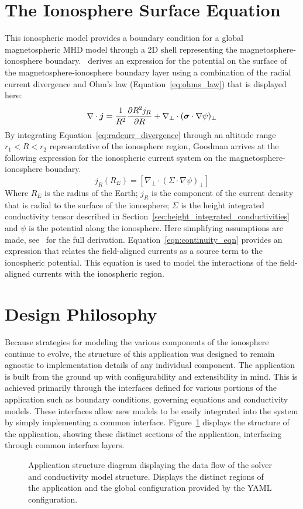 \section{The Ionosphere Surface Equation}
This ionospheric model provides a boundary condition for a global magnetospheric MHD model through a 2D shell representing the magnetosphere-ionosphere boundary.~\citet{goodman1995} derives an expression for the potential on the surface of the magnetosphere-ionosphere boundary layer using a combination of the radial current divergence and Ohm's law (Equation~\ref{eq:ohms_law}) that is displayed here:
\begin{equation}
	\nabla \cdot \bm j = \frac1{R^2}\pdv{R^2j_R}{R} + \nabla_\perp \cdot(\bm\sigma\cdot \nabla\psi)_\perp
	\label{eq:radcurr_divergence}
\end{equation}
By integrating Equation~\ref{eq:radcurr_divergence} through an altitude range $r_1 < R < r_2$ representative of the ionosphere region, Goodman arrives at the following expression for the ionospheric current system on the magnetosphere-ionosphere boundary.
\begin{equation}
	j_R(R_E) = \left[\nabla_\perp \cdot (\Sigma \cdot \nabla\psi)_\perp\right]
	\label{eqn:continuity_eqn}
\end{equation}
Where $R_E$ is the radius of the Earth; $j_R$ is the component of the current density that is radial to the surface of the ionosphere; $\Sigma$ is the height integrated conductivity tensor described in Section~\ref{sec:height_integrated_conductivities} and $\psi$ is the potential along the ionosphere. Here simplifying assumptions are made, see~\citep{goodman1995} for the full derivation. Equation~\ref{eqn:continuity_eqn} provides an expression that relates the field-aligned currents as a source term to the ionospheric potential. This equation is used to model the interactions of the field-aligned currents with the ionospheric region.
\section{Design Philosophy}
Because strategies for modeling the various components of the ionosphere continue to evolve, the structure of this application was designed to remain agnostic to implementation details of any individual component. The application is built from the ground up with configurability and extensibility in mind. This is achieved primarily through the interfaces defined for various portions of the application such as boundary conditions, governing equations and conductivity models. These interfaces allow new models to be easily integrated into the system by simply implementing a common interface. Figure~\ref{diag:full_flow2} displays the structure of the application, showing these distinct sections of the application, interfacing through common interface layers.
\begin{figure}[H]
	\centering
	
	\caption{Application structure diagram displaying the data flow of the solver and conductivity model structure. Displays the distinct regions of the application and the global configuration provided by the YAML configuration.}
	\label{diag:full_flow2}
\end{figure}

